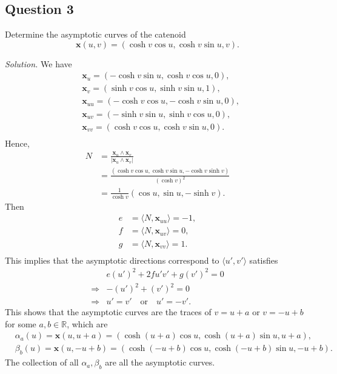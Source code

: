 \documentclass[12pt]{article}
\begin{document}
\subsection*{Question 3}
Determine the asymptotic curves of the catenoid
\begin{equation*}
    \mathbf{x}(u,v)= (\cosh{v}\cos{u},\cosh{v}\sin{u},v).
\end{equation*}

\textit{Solution.} We have \begin{align*}
    &\mathbf{x}_u= (-\cosh{v}\sin{u},\cosh{v}\cos{u},0),\\
    &\mathbf{x}_v= (\sinh{v}\cos{u},\sinh{v}\sin{u},1),\\
    &\mathbf{x}_{uu}= (-\cosh{v}\cos{u},-\cosh{v}\sin{u},0),\\
    &\mathbf{x}_{uv}= (-\sinh{v}\sin{u},\sinh{v}\cos{u},0),\\
    &\mathbf{x}_{vv}= (\cosh{v}\cos{u},\cosh{v}\sin{u},0).\\
\end{align*}
Hence, \begin{align*}
    N &= \frac{\mathbf{x}_u\wedge \mathbf{x}_v}{|\mathbf{x}_u\wedge \mathbf{x}_v|}\\
    &=\frac{(\cosh{v}\cos{u},\cosh{v}\sin{u},-\cosh{v}\sinh{v})}{(\cosh{v})^2}\\
    &=\frac{1}{\cosh{v}}(\cos{u},\sin{u},-\sinh{v}).
\end{align*}
Then\begin{align*}
    e &= \langle N,\mathbf{x}_{uu}\rangle = -1,\\
    f &= \langle N,\mathbf{x}_{uv}\rangle = 0,\\
    g &= \langle N,\mathbf{x}_{vv}\rangle = 1.\\
\end{align*}
This implies that the asymptotic directions correspond to $\langle u',v'\rangle$ satisfies \begin{align*}
    &e(u')^2 + 2fu'v' + g(v')^2 = 0\\
    \Rightarrow &-(u')^2 + (v')^2 = 0\\
    \Rightarrow & u'=v' \quad\text{or}\quad u'=-v'.
\end{align*}
This shows that the asymptotic curves are the traces of $v=u+a$ or $v=-u+b$ for some $a,b\in\mathbb{R}$, which are \begin{align*}
    &\alpha_a(u) = \mathbf{x}(u,u+a) = (\cosh{(u+a)}\cos{u},\cosh{(u+a)}\sin{u},u+a),\\
    &\beta_b(u) = \mathbf{x}(u,-u+b) = (\cosh{(-u+b)}\cos{u},\cosh{(-u+b)}\sin{u},-u+b).
\end{align*}
The collection of all $\alpha_a,\beta_b$ are all the asymptotic curves.
\end{document}
